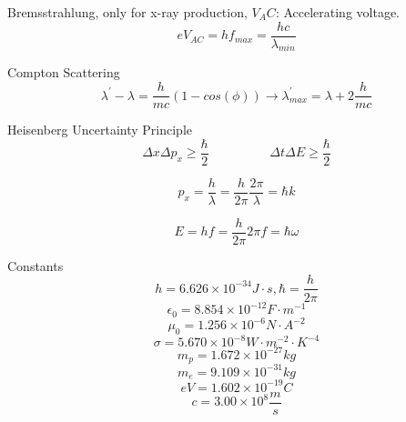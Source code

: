 \documentclass[12pt]{article}
\begin{document}
Bremsstrahlung, only for x-ray production, $V_AC$: Accelerating voltage.
$$
e V_{AC} = hf_{max} = \frac{hc}{\lambda_{min}}
$$

Compton Scattering
$$
\lambda^{\prime} - \lambda = \frac{h}{mc}(1-cos(\phi)) \rightarrow \lambda^{\prime}_{max} = \lambda + 2 \frac{h}{mc}
$$

Heisenberg Uncertainty Principle
$$
\Delta x \Delta p_x \geq \frac{\hbar}{2} \hspace{2cm} \Delta t \Delta E \geq \frac{\hbar}{2}
$$

$$
p_x = \frac{h}{\lambda} = \frac{h}{2\pi} \frac{2\pi}{\lambda} = \hbar k
$$

$$
E = hf = \frac{h}{2\pi} 2 \pi f = \hbar \omega
$$

\newpage


Constants
$$
h = 6.626 \times 10^{-34} J \cdot s, \hbar = \frac{h}{2 \pi}
$$
$$
\epsilon_0 = 8.854 \times 10^{-12} F \cdot m^{-1}
$$
$$
\mu_0 = 1.256 \times 10^{-6} N \cdot A^{-2}
$$
$$
\sigma = 5.670 \times 10^{-8} W \cdot m^{-2} \cdot K^{-4}
$$
$$
m_{p} = 1.672 \times 10^{-27} kg
$$
$$
m_{e} = 9.109 \times 10^{-31} kg
$$
$$
eV = 1.602 \times 10^{-19} C
$$
$$
c = 3.00 \times 10^{8} \frac{m}{s}
$$
\end{document}
